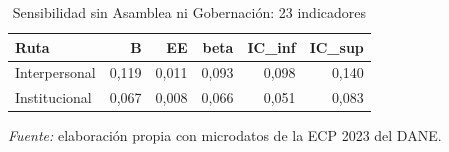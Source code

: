 \begin{table}

\caption{\label{tab:territorial}Sensibilidad sin Asamblea ni Gobernación: 23 indicadores}
\centering
\begin{tabular}[t]{lrrrrr}
\toprule
Ruta & B & EE & beta & IC\_inf & IC\_sup\\
\midrule
Interpersonal & 0,119 & 0,011 & 0,093 & 0,098 & 0,140\\
Institucional & 0,067 & 0,008 & 0,066 & 0,051 & 0,083\\
\bottomrule
\end{tabular}
\par\smallskip\noindent\parbox{\linewidth}{\footnotesize\textit{Fuente:} elaboración propia con microdatos de la ECP 2023 del DANE.}
\end{table}
